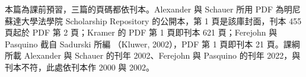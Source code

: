 本篇為課前預習，三篇的頁碼都依刊本。Alexander 與 Schauer 所用 PDF 為明尼蘇達大學法學院 Scholarship Repository 的公開本，第 1 頁是該庫封面，刊本 455 頁起於 PDF 第 2 頁；Kramer 的 PDF 第 1 頁即刊本 621 頁；Ferejohn 與 Pasquino 截自 Sadurski 所編 （Kluwer, 2002），PDF 第 1 頁即刊本 21 頁。課綱所載 Alexander 與 Schauer 的刊年 2002、Ferejohn 與 Pasquino 的刊年 2022，與刊本不符，此處依刊本作 2000 與 2002。
